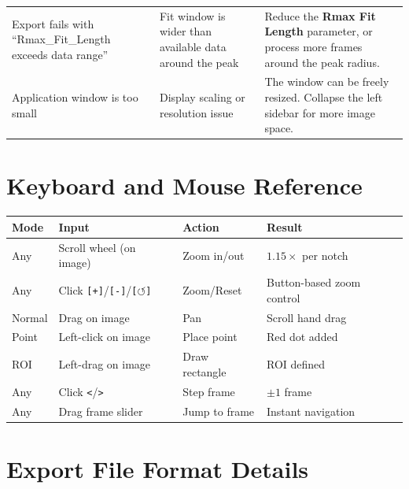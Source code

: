 \documentclass[11pt, letterpaper]{article}
\begin{document}
\begin{center}
\begin{tabular}{p{4.5cm}p{4cm}p{5cm}}
    Export fails with ``Rmax\_Fit\_Length exceeds data range'' &
    Fit window is wider than available data around the peak &
    Reduce the \textbf{Rmax Fit Length} parameter, or process more
    frames around the peak radius. \\

    Application window is too small &
    Display scaling or resolution issue &
    The window can be freely resized. Collapse the left sidebar for
    more image space. \\

    \bottomrule
\end{tabular}
\end{center}


\section{Keyboard and Mouse Reference}

\begin{center}
\renewcommand{\arraystretch}{1.3}
\begin{tabular}{llll}
    \toprule
    \textbf{Mode} & \textbf{Input} & \textbf{Action} & \textbf{Result} \\
    \midrule
    Any & Scroll wheel (on image) & Zoom in/out & $1.15\times$ per notch \\
    Any & Click \texttt{[+]}/\texttt{[-]}/\texttt{[$\circlearrowleft$]}
        & Zoom/Reset & Button-based zoom control \\
    Normal & Drag on image & Pan & Scroll hand drag \\
    Point  & Left-click on image & Place point & Red dot added \\
    ROI    & Left-drag on image & Draw rectangle & ROI defined \\
    Any & Click \texttt{<}/\texttt{>} & Step frame & $\pm 1$ frame \\
    Any & Drag frame slider & Jump to frame & Instant navigation \\
    \bottomrule
\end{tabular}
\end{center}


\section{Export File Format Details}
\end{document}
